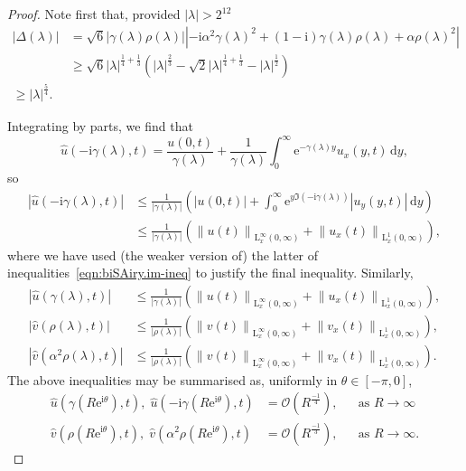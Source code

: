 \documentclass[10pt,a4paper]{amsart}
\newcommand{\D}{\ensuremath{\,\mathrm{d}}}
\providecommand{\Lebesgue}{\mathrm{L}} %
\newcommand{\abs}[1]{\left\lvert#1\right\rvert}
\providecommand{\bigoh}[1]{\mathcal{O}\left(#1\right)}
\renewcommand{\geq}{\geqslant}
\newcommand{\la}{\ensuremath{\lambda}}
\renewcommand{\leq}{\leqslant}
\newcommand{\normp}[2]{\left\lVert#1\right\rVert_{#2}}
\newcommand{\re}{\ensuremath{\mathrm{e}}}
\newcommand{\ri}{\ensuremath{\mathrm{i}}}
\begin{document}
\begin{proof}
  Note first that, provided $\abs\la>2^{12}$
  \begin{align*}
    \abs{\Delta(\la)} &= \sqrt6 \abs{\gamma(\la)\rho(\la)} \abs{ -\ri\alpha^2\gamma(\la)^2 + (1-\ri)\gamma(\la)\rho(\la) + \alpha\rho(\la)^2 } \\
    &\geq \sqrt6 \abs\la^{\frac14+\frac13}\left( \abs\la^{\frac23} - \sqrt2\abs\la^{\frac14+\frac13} - \abs\la^{\frac12} \right) \\
    \geq \abs\la^{\frac54}.
  \end{align*}

  Integrating by parts, we find that
  \[
    \widehat u(-\ri\gamma(\la),t) = \frac{u(0,t)}{\gamma(\la)} + \frac1{\gamma(\la)} \int_0^\infty \re^{-\gamma(\la)y}u_x(y,t)\D y,
  \]
  so
  \begin{align*}
    \abs{\widehat u(-\ri\gamma(\la),t)}
    &\leq \frac1{\abs{\gamma(\la)}} \left( \abs{u(0,t)} + \int_0^\infty \re^{y\Im(-\ri\gamma(\la))} \abs{u_y(y,t)} \D y \right) \\
    &\leq \frac1{\abs{\gamma(\la)}} \left( \normp{u(t)}{\Lebesgue^\infty_x(0,\infty)} + \normp{u_x(t)}{\Lebesgue^1_x(0,\infty)} \right),
  \end{align*}
  where we have used (the weaker version of) the latter of inequalities~\eqref{eqn:biSAiry.im-ineq} to justify the final inequality.
  Similarly,
  \begin{align*}
    \abs{\widehat u(\gamma(\la),t)}
    &\leq
    \frac1{\abs{\gamma(\la)}} \left( \normp{u(t)}{\Lebesgue^\infty_x(0,\infty)} + \normp{u_x(t)}{\Lebesgue^1_x(0,\infty)} \right),
    \\
    \abs{\widehat v(\rho(\la),t)}
    &\leq
    \frac1{\abs{\rho(\la)}} \left( \normp{v(t)}{\Lebesgue^\infty_x(0,\infty)} + \normp{v_x(t)}{\Lebesgue^1_x(0,\infty)} \right),
    \\
    \abs{\widehat v(\alpha^2\rho(\la),t)}
    &\leq
    \frac1{\abs{\rho(\la)}} \left( \normp{v(t)}{\Lebesgue^\infty_x(0,\infty)} + \normp{v_x(t)}{\Lebesgue^1_x(0,\infty)} \right).
  \end{align*}
  The above inequalities may be summarised as, uniformly in $\theta\in[-\pi,0]$,
  \begin{align*}
    \widehat u\left(\gamma\left(R\re^{\ri\theta}\right),t\right),\; \widehat u\left(-\ri\gamma\left(R\re^{\ri\theta}\right),t\right) &= \bigoh{R^{\frac{-1}4}},
    & &\mbox{as } R\to\infty \\
    \widehat v\left(\rho\left(R\re^{\ri\theta}\right),t\right),\; \widehat v\left(\alpha^2\rho\left(R\re^{\ri\theta}\right),t\right) &= \bigoh{R^{\frac{-1}3}},
    & &\mbox{as } R\to\infty.
  \end{align*}


\end{proof}
\end{document}
